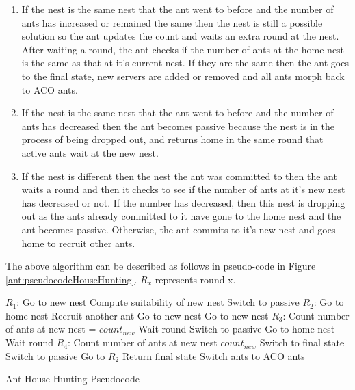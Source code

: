 \begin{enumerate}
	\item If the nest is the same nest that the ant went to before and the number of ants has increased or remained the same then the nest is still a possible solution so the ant updates the count and waits an extra round at the nest. After waiting a round, the ant checks if the number of ants at the home nest is the same as that at it's current nest. If they are the same then the ant goes to the final state, new servers are added or removed and all ants morph back to ACO ants.
	\item If the nest is the same nest that the ant went to before and the number of ants has decreased then the ant becomes passive because the nest is in the process of being dropped out, and returns home in the same round that active ants wait at the new nest.
	\item If the nest is different then the nest the ant was committed to then the ant waits a round and then it checks to see if the number of ants at it's new nest has decreased or not. If the number has decreased, then this nest is dropping out as the ants already committed to it have gone to the home nest and the ant becomes passive. Otherwise, the ant commits to it's new nest and goes home to recruit other ants.
\end{enumerate}

The above algorithm can be described as follows in pseudo-code in Figure \ref{ant:pseudocodeHouseHunting}. $R_{x}$ represents round x.

\begin{algorithm}
\begin{algorithmic}
	\State $R_{1}$: Go to new nest
	\State Compute suitability of new nest
		Switch to passive
	\EndIf
	\State $R_{2}$: Go to home nest
		\State Recruit another ant
		\State Go to new nest
		\State Go to new nest
	\EndIf
	\State $R_{3}$: Count number of ants at new nest = $count_{new}$
		\State Wait round
		\State Switch to passive
		\State Go to home nest
		\State Wait round
	\EndIf
	\State $R_{4}$: Count number of ants at new nest $count_{new}$
		\State Switch to final state
		\State Switch to passive
		\State Go to $R_{2}$
	\EndIf
	\State Return final state
	\State Switch ants to ACO ants
\end{algorithmic}
\caption{Ant House Hunting Pseudocode}\label{ant:pseudocodeHouseHunting}
\end{algorithm}

